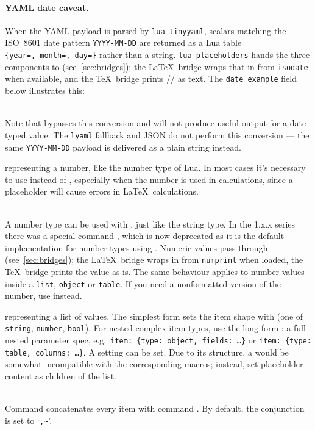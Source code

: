 \documentclass{ltxdoc}
\newcommand\showexample[5][15pt]{%
\begin{minipage}[t]{.5\linewidth - .5 \columnsep}%

\end{minipage}\hspace*{\columnsep}%
\begin{minipage}[t]{.5\linewidth - .5 \columnsep}%

\end{minipage}\\%
}
\begin{document}
\begin{description}
        \paragraph{YAML date caveat.}
        When the YAML payload is parsed by \texttt{lua-tinyyaml}, scalars matching the ISO~8601 date pattern \texttt{YYYY-MM-DD} are returned as a Lua table \texttt{\{year=,~month=,~day=\}} rather than a string.
        \texttt{lua-placeholders} hands the three components to \cmd{\paramdateformat} (see~\ref{sec:bridges}); the \LaTeX\ bridge wraps that in \cmd{\printdateTeX} from \texttt{isodate}\cite{isodate} when available, and the \TeX\ bridge prints // as text.
        The \texttt{date~example} field below illustrates this:\\
        \showexample{7}{7-9}{3}{3-3}
        Note that \cmd{\rawparam} bypasses this conversion and will not produce useful output for a date-typed value.
        The \texttt{lyaml} fallback and JSON do not perform this conversion --- the same \texttt{YYYY-MM-DD} payload is delivered as a plain string instead.
        \item[number] representing a number, like the number type of Lua.
        In most cases it's necessary to use  instead of , especially when the number is used in calculations, since a placeholder will cause errors in \LaTeX\ calculations.\\
        \showexample{10}{10-12}{4}{4-4}
        \DescribeMacro{\param}
        A number type can be used with \cmd{\param}, just like the string type.
        In the 1.x.x series there was a special command \cmd{\numparam}, which is now deprecated as it is the default implementation for number types using \cmd{\param}.
        Numeric values pass through \cmd{\paramnumberformat} (see~\ref{sec:bridges}); the \LaTeX\ bridge wraps in \cmd{\numprint} from \texttt{numprint}\cite{numprint} when loaded, the \TeX\ bridge prints the value as-is.
        The same behaviour applies to number values inside a \texttt{list}, \texttt{object} or \texttt{table}.
        If you need a nonformatted version of the number, use \cmd{\rawparam} instead.
        \item[list] representing a list of values.
        The simplest form sets the item shape with  (one of \texttt{string}, \texttt{number}, \texttt{bool}).
        For nested complex item types, use the long form : a full nested parameter spec, e.g.\ \texttt{item: \{type: object, fields: \dots\}} or \texttt{item: \{type: table, columns: \dots\}}.
        A  setting can be set.
        Due to its structure, a  would be somewhat incompatible with the corresponding macros; instead, set placeholder content as children of the  list.\\
        \showexample{13}{13-18}{5}{5-7}
        \DescribeMacro{\param}
        Command \cmd{\param} concatenates every item with command \cmd{\paramlistconjunction}.
        \DescribeMacro{\paramlistconjunction}
        By default, the conjunction is set to `\texttt{,\textasciitilde}'.


\end{description}
\end{document}
